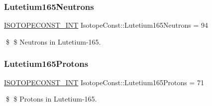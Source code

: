 \subsubsection{\texorpdfstring{Lutetium165\+Neutrons}{Lutetium165Neutrons}}
{\footnotesize\ttfamily \mbox{\hyperlink{group___isotope_const-_macros_ga5f18360b3e99483a35c32d789e62621c}{I\+S\+O\+T\+O\+P\+E\+C\+O\+N\+S\+T\+\_\+\+I\+NT}} Isotope\+Const\+::\+Lutetium165\+Neutrons = 94}

\$ \$ Neutrons in Lutetium-\/165. \mbox{\label{group___isotope_const-_lutetium-_lu165_gae50db69af75e5dd7d0125fc6584a7b88}} 
\subsubsection{\texorpdfstring{Lutetium165\+Protons}{Lutetium165Protons}}
{\footnotesize\ttfamily \mbox{\hyperlink{group___isotope_const-_macros_ga5f18360b3e99483a35c32d789e62621c}{I\+S\+O\+T\+O\+P\+E\+C\+O\+N\+S\+T\+\_\+\+I\+NT}} Isotope\+Const\+::\+Lutetium165\+Protons = 71}

\$ \$ Protons in Lutetium-\/165. 